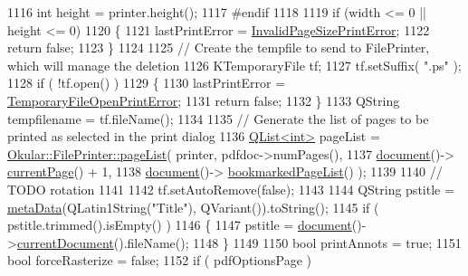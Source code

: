 \begin{DoxyCode}
1116     \textcolor{keywordtype}{int} height = printer.height();
1117 \textcolor{preprocessor}{#endif}
1118 
1119     \textcolor{keywordflow}{if} (width <= 0 || height <= 0)
1120     \{
1121         lastPrintError = \hyperlink{classOkular_1_1Generator_a43266d4eb3e7929924dd10ea53bc1d61a48f3e94e2e31e0b7d7d8d40bcc25f504}{InvalidPageSizePrintError};
1122         \textcolor{keywordflow}{return} \textcolor{keyword}{false};
1123     \}
1124 
1125     \textcolor{comment}{// Create the tempfile to send to FilePrinter, which will manage the deletion}
1126     KTemporaryFile tf;
1127     tf.setSuffix( \textcolor{stringliteral}{".ps"} );
1128     \textcolor{keywordflow}{if} ( !tf.open() )
1129     \{
1130         lastPrintError = \hyperlink{classOkular_1_1Generator_a43266d4eb3e7929924dd10ea53bc1d61adbece3d0a13cec6d66bbc310be83da49}{TemporaryFileOpenPrintError};
1131         \textcolor{keywordflow}{return} \textcolor{keyword}{false};
1132     \}
1133     QString tempfilename = tf.fileName();
1134 
1135     \textcolor{comment}{// Generate the list of pages to be printed as selected in the print dialog}
1136     \hyperlink{classQList}{QList<int>} pageList = \hyperlink{classOkular_1_1FilePrinter_aed485e5e3fbe591b16e15915e318a1b7}{Okular::FilePrinter::pageList}( printer, 
      pdfdoc->numPages(),
1137                                                          \hyperlink{classOkular_1_1Generator_a4248672ef04e62660d51f16c0a862bbe}{document}()->
      \hyperlink{classOkular_1_1Document_a42ec374d73794bf56d7e7b11f1f56319}{currentPage}() + 1,
1138                                                          \hyperlink{classOkular_1_1Generator_a4248672ef04e62660d51f16c0a862bbe}{document}()->
      \hyperlink{classOkular_1_1Document_a01de5a7212e14772e647a8e1caa07627}{bookmarkedPageList}() );
1139 
1140     \textcolor{comment}{// TODO rotation}
1141 
1142     tf.setAutoRemove(\textcolor{keyword}{false});
1143 
1144     QString pstitle = \hyperlink{classPDFGenerator_a1ec53a069478b38389ed689e5881f98d}{metaData}(QLatin1String(\textcolor{stringliteral}{"Title"}), QVariant()).toString();
1145     \textcolor{keywordflow}{if} ( pstitle.trimmed().isEmpty() )
1146     \{
1147         pstitle = \hyperlink{classOkular_1_1Generator_a4248672ef04e62660d51f16c0a862bbe}{document}()->\hyperlink{classOkular_1_1Document_acb6f05a191623dafbdf5d4788dd98fed}{currentDocument}().fileName();
1148     \}
1149 
1150     \textcolor{keywordtype}{bool} printAnnots = \textcolor{keyword}{true};
1151     \textcolor{keywordtype}{bool} forceRasterize = \textcolor{keyword}{false};
1152     \textcolor{keywordflow}{if} ( pdfOptionsPage )

\end{DoxyCode}
